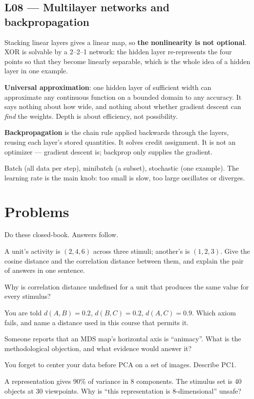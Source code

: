 \documentclass[11pt]{article}
\begin{document}
\subsection{L08 --- Multilayer networks and backpropagation}

Stacking linear layers gives a linear map, so \textbf{the nonlinearity is not
optional}. XOR is solvable by a 2--2--1 network: the hidden layer re-represents
the four points so that they become linearly separable, which is the whole idea
of a hidden layer in one example.

\textbf{Universal approximation}: one hidden layer of sufficient width can
approximate any continuous function on a bounded domain to any accuracy. It
says nothing about how wide, and nothing about whether gradient descent can
\emph{find} the weights. Depth is about efficiency, not possibility.

\textbf{Backpropagation} is the chain rule applied backwards through the layers,
reusing each layer's stored quantities. It solves credit assignment. It is not
an optimizer --- gradient descent is; backprop only supplies the gradient.

Batch (all data per step), minibatch (a subset), stochastic (one example).
The learning rate is the main knob: too small is slow, too large oscillates or
diverges.

\section{Problems}

Do these closed-book. Answers follow.

 A unit's activity is $(2, 4, 6)$ across three stimuli; another's is
$(1, 2, 3)$. Give the cosine distance and the correlation distance between them,
and explain the pair of answers in one sentence.

 Why is correlation distance undefined for a unit that produces the same
value for every stimulus?

 You are told $d(A,B) = 0.2$, $d(B,C) = 0.2$, $d(A,C) = 0.9$. Which
axiom fails, and name a distance used in this course that permits it.

 Someone reports that an MDS map's horizontal axis is ``animacy''. What
is the methodological objection, and what evidence would answer it?

 You forget to center your data before PCA on a set of images. Describe
PC1.

 A representation gives 90\% of variance in 8 components. The stimulus
set is 40 objects at 30 viewpoints. Why is ``this representation is
8-dimensional'' unsafe?
\end{document}
